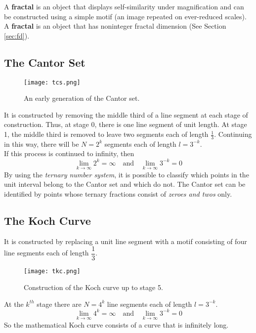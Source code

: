 A \textbf{fractal} is an object that displays self-similarity under magnification and can be constructed using a simple motif (an image repeated on ever-reduced scales).\\
A \textbf{fractal} is an object that has noninteger fractal dimension (See Section \ref{sec:fd}).
\subsection{The Cantor Set}
\begin{wrapfigure}{r}{0.3\linewidth}
	\centering
	\texttt{[image: tcs.png]}
	\caption{An early generation of the Cantor set.}
	\label{fig:tcs}
\end{wrapfigure}
It is constructed by removing the middle third of a line segment at each stage of construction.
Thus, at stage 0, there is one line segment of unit length.
At stage 1, the middle third is removed to leave two segments each of length $\frac{1}{3}$.
Continuing in this way, there will be $N=2^k$ segments each of length $l=3^{-k}$.\\
If this process is continued to infinity, then
\begin{equation}
	\lim_{k\rightarrow\infty}2^k=\infty\quad\text{and}\quad\lim_{k\rightarrow\infty}3^{-k}=0
\end{equation}
By using the\emph{ ternary number system}, it is possible to classify which points in the unit interval belong to the Cantor set and which do not.
The Cantor set can be identified by points whose ternary fractions consist of \emph{zeroes and twos} only.
\subsection{The Koch Curve}
It is constructed by replacing a unit line segment with a motif consisting of four line segments each of length $\dfrac{1}{3}$.
\begin{figure}[h!]
	\centering
	\texttt{[image: tkc.png]}
	\caption{Construction of the Koch curve up to stage 5.}
	\label{fig:tkc}
\end{figure}
At the $k^{th}$ stage there are $N=4^k$ line segments each of length $l=3^{-k}$.
\begin{equation}
	\lim_{k\rightarrow\infty}4^k=\infty\quad\text{and}\quad\lim_{k\rightarrow\infty}3^{-k}=0
\end{equation}
So the mathematical Koch curve consists of a curve that is infinitely long.
